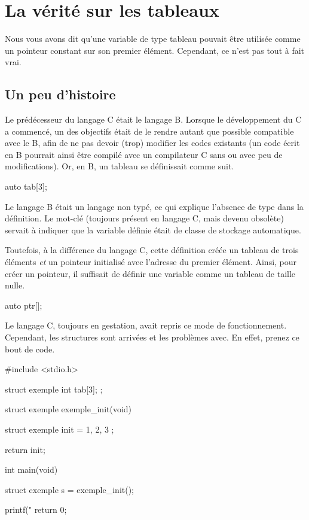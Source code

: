 \section{La vérité sur les tableaux }
\label{la-verite-sur-les-tableaux }

Nous vous avons dit qu'une variable de type tableau pouvait être
utilisée comme un pointeur constant sur son premier élément. Cependant,
ce n'est pas tout à fait vrai.

\subsection{Un peu d'histoire}
\label{un-peu-dhistoire}

Le prédécesseur du langage C était le langage B. Lorsque le
développement du C a commencé, un des objectifs était de le rendre
autant que possible compatible avec le B, afin de ne pas devoir (trop)
modifier les codes existants (un code écrit en B pourrait ainsi être
compilé avec un compilateur C sans ou avec peu de modifications). Or, en
B, un tableau se définissait comme suit.

\begin{C}
auto tab[3];
\end{C}

\begin{infobox}
Le langage B était un langage non
typé, ce qui explique l'absence de type dans la définition. Le mot-clé
 (toujours présent en langage C, mais devenu obsolète)
servait à indiquer que la variable définie était de classe de stockage
automatique.
\end{infobox}


Toutefois, à la différence du langage C, cette définition créée un
tableau de trois éléments \emph{et} un pointeur initialisé avec
l'adresse du premier élément. Ainsi, pour créer un pointeur, il
suffisait de définir une variable comme un tableau de taille nulle.

\begin{C}
auto ptr[];
\end{C}

Le langage C, toujours en gestation, avait repris ce mode de
fonctionnement. Cependant, les structures sont arrivées et les problèmes
avec. En effet, prenez ce bout de code.

\begin{C}
#include <stdio.h>

struct exemple {
    int tab[3];
};


struct exemple exemple_init(void)
{
    struct exemple init = { { 1, 2, 3 } };

    return init;
}


int main(void)
{
    struct exemple s = exemple_init();

    printf("%
    return 0;
}
\end{C}

